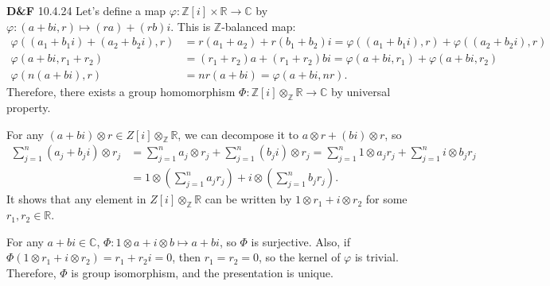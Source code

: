 \documentclass[a4paper, 12pt]{article}
\theoremstyle{Mydefinition}
\theoremstyle{Mytheorem}
\begin{document}
\noindent \textbf{D\&F} 10.4.24
Let's define a map $\varphi:\mathbb{Z}[i]\times \mathbb{R}\rightarrow \mathbb{C}$ by $\varphi:(a+bi, r)\mapsto (ra)+(rb)i$. This is $\mathbb{Z}$-balanced map:
\begin{equation}
    \begin{split}
        \varphi((a_1+b_1i)+(a_2+b_2i), r) &= r(a_1+a_2)+r(b_1+b_2)i = \varphi((a_1+b_1i), r) + \varphi((a_2+b_2i), r)\\
        \varphi(a+bi, r_1+r_2) &= (r_1+r_2)a+(r_1+r_2)bi = \varphi(a+bi, r_1) + \varphi(a+bi, r_2)\\
        \varphi(n(a+bi), r) &= nr(a+bi) = \varphi(a+bi, nr).
    \end{split}
\end{equation}
Therefore, there exists a group homomorphism $\Phi:\mathbb{Z}[i]\otimes_{\mathbb{Z}} \mathbb{R}\rightarrow \mathbb{C}$ by universal property. 

For any $(a+bi)\otimes r\in Z[i]\otimes_{\mathbb{Z}}\mathbb{R}$, we can decompose it to $a\otimes r + (bi)\otimes r$, so
\begin{equation}
\begin{split}
    \sum_{j=1}^n (a_j+b_ji)\otimes r_j &= \sum_{j=1}^n a_j\otimes r_j + \sum_{j=1}^n (b_ji)\otimes r_j = \sum_{j=1}^n 1\otimes a_jr_j + \sum_{j=1}^n i\otimes b_jr_j\\
    &= 1\otimes \left(\sum_{j=1}^n a_jr_j\right) + i\otimes \left(\sum_{j=1}^n b_jr_j\right).
\end{split}
\end{equation}
It shows that any element in $Z[i]\otimes_{\mathbb{Z}}\mathbb{R}$ can be written by $1\otimes r_1+i\otimes r_2$ for some $r_1,r_2\in\mathbb{R}$.

For any $a+bi\in \mathbb{C}$,  $\Phi:1\otimes a + i\otimes b\mapsto a+bi$, so $\Phi$ is surjective. Also, if $\Phi(1\otimes r_1+i\otimes r_2) = r_1+r_2 i = 0$, then $r_1=r_2=0$, so the kernel of $\varphi$ is trivial. Therefore, $\Phi$ is group isomorphism, and the presentation is unique.
\end{document}
